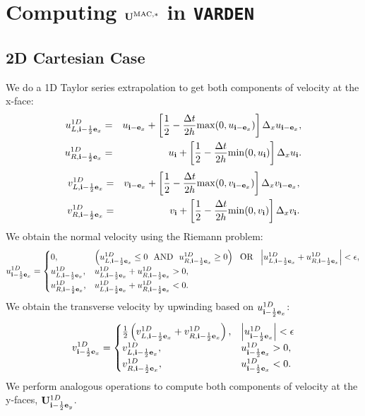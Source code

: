 \section{Computing ${\bf U}^{\rm MAC,*}$ in {\tt VARDEN}}

\subsection{2D Cartesian Case}
We do a 1D Taylor series extrapolation to get both components of velocity at the x-face:
\begin{eqnarray}
u_{L,{\bf i}-\frac{1}{2}{\bf e}_x}^{1D} &=& u_{{\bf i}-{\bf e}_x} + \left[\frac{1}{2} - \frac{\Delta t}{2h}{\rm max}(0,u_{{\bf i}-{\bf e}_x})\right]\Delta_xu_{{\bf i}-{\bf e}_x}, \label{varden U_L^1D} \\
u_{R,{\bf i}-\frac{1}{2}{\bf e}_x}^{1D} &=& u_{{\bf i}} + \left[\frac{1}{2} - \frac{\Delta t}{2h}{\rm min}(0,u_{{\bf i}})\right]\Delta_xu_{{\bf i}}.
\end{eqnarray}
\begin{eqnarray}
v_{L,{\bf i}-\frac{1}{2}{\bf e}_x}^{1D} &=& v_{{\bf i}-{\bf e}_x} + \left[\frac{1}{2} - \frac{\Delta t}{2h}{\rm max}(0,v_{{\bf i}-{\bf e}_x})\right]\Delta_xv_{{\bf i}-{\bf e}_x}, \\
v_{R,{\bf i}-\frac{1}{2}{\bf e}_x}^{1D} &=& v_{{\bf i}} + \left[\frac{1}{2} - \frac{\Delta t}{2h}{\rm min}(0,v_{{\bf i}})\right]\Delta_xv_{{\bf i}}.
\end{eqnarray}
We obtain the normal velocity using the Riemann problem:
\begin{equation}
u_{{\bf i}-\frac{1}{2}{\bf e}_x}^{1D} =
\begin{cases}
0, & \left(u_{L,{\bf i}-\frac{1}{2}{\bf e}_x}^{1D} \le 0 ~~ {\rm AND} ~~ u_{R,{\bf i}-\frac{1}{2}{\bf e}_x}^{1D} \ge 0\right) ~~ {\rm OR} ~~ \left|u_{L,{\bf i}-\frac{1}{2}{\bf e}_x}^{1D} + u_{R,{\bf i}-\frac{1}{2}{\bf e}_x}^{1D}\right| < \epsilon, \\
u_{L,{\bf i}-\frac{1}{2}{\bf e}_x}^{1D}, & u_{L,{\bf i}-\frac{1}{2}{\bf e}_x}^{1D} + u_{R,{\bf i}-\frac{1}{2}{\bf e}_x}^{1D} > 0, \\
u_{R,{\bf i}-\frac{1}{2}{\bf e}_x}^{1D}, & u_{L,{\bf i}-\frac{1}{2}{\bf e}_x}^{1D} + u_{R,{\bf i}-\frac{1}{2}{\bf e}_x}^{1D} < 0.
\end{cases}
\end{equation}
We obtain the transverse velocity by upwinding based on
$u_{{\bf i}-\frac{1}{2}{\bf e}_x}^{1D}$:
\begin{equation}
v_{{\bf i}-\frac{1}{2}{\bf e}_x}^{1D} =
\begin{cases}
\frac{1}{2}\left(v_{L,{\bf i}-\frac{1}{2}{\bf e}_x}^{1D} + v_{R,{\bf i}-\frac{1}{2}{\bf e}_x}^{1D}\right), & \left|u_{{\bf i}-\frac{1}{2}{\bf e}_x}^{1D}\right| < \epsilon \\
v_{L,{\bf i}-\frac{1}{2}{\bf e}_x}^{1D}, & u_{{\bf i}-\frac{1}{2}{\bf e}_x}^{1D} > 0, \\
v_{R,{\bf i}-\frac{1}{2}{\bf e}_x}^{1D}, & u_{{\bf i}-\frac{1}{2}{\bf e}_x}^{1D} < 0.
\end{cases}\label{Transverse Velocity Riemann Problem}
\end{equation}
We perform analogous operations to compute both components of velocity
at the y-faces, ${\bf U}_{{\bf i}-\frac{1}{2}{\bf e}_y}^{1D}$. \\

